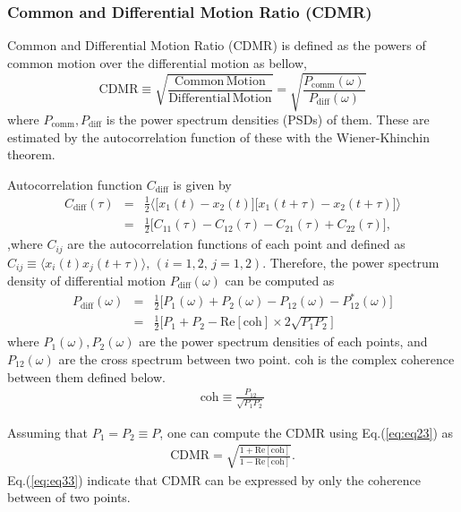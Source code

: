 \documentclass[a4paper,12pt]{book}
\begin{document}
\subsubsection{Common and Differential Motion Ratio (CDMR)}
Common and Differential Motion Ratio (CDMR) is defined as the powers of common motion over the differential motion as bellow,
\begin{equation}
  \mathrm{CDMR} \equiv \sqrt{\frac{\mathrm{Common\,Motion}}{\mathrm{Differential\,Motion}}} = \sqrt{\frac{P_{\mathrm{comm}}(\omega)}{P_{\mathrm{diff}}(\omega)}} \label{eq:eq23}
\end{equation}
where $P_{\mathrm{comm}},P_{\mathrm{diff}}$ is the power spectrum densities (PSDs) of them. These are estimated by the autocorrelation function of these with the Wiener-Khinchin theorem.

Autocorrelation function $C_{\mathrm{diff}}$ is given by
\begin{eqnarray}
  C_{\mathrm{diff}}(\tau) &=& \frac{1}{2}
  \biggl\langle
  \biggl[ x_{1}(t)-x_{2}(t) \biggr] \biggl[ x_{1}(t+\tau)-x_{2}(t+\tau) \biggr]
  \biggr\rangle \\
  &=& \frac{1}{2}\biggl[ C_{11}(\tau) - C_{12}(\tau) - C_{21}(\tau) + C_{22}(\tau) \biggr], 
\end{eqnarray}
,where $C_{ij}$ are the autocorrelation functions of each point and defined as $ C_{ij} \equiv \langle x_{i}(t)x_{j}(t+\tau)\rangle,\, (i=1,2,\,j=1,2)$. Therefore, the power spectrum density of differential motion $P_{\mathrm{diff}}(\omega)$ can be computed as
\begin{eqnarray}
  P_{\mathrm{diff}}(\omega) &=& \frac{1}{2}\biggl[ P_{1}(\omega) + P_{2}(\omega) - P_{12}(\omega) - P_{12}^*(\omega) \biggr]\\
  &=& \frac{1}{2} \biggl[ P_{1}+P_{2} - \mathrm{Re}\left[\mathrm{coh} \right]\times2\sqrt{P_{1}P_{2}} \biggr] \label{eq:eq31}
\end{eqnarray}
where $P_{1}(\omega),P_{2}(\omega)$ are the power spectrum densities of each points, and $P_{12}(\omega)$ are the cross spectrum between two point. $\mathrm{coh}$ is the complex coherence between them defined below.
\begin{eqnarray}
  \mathrm{coh} \equiv \frac{P_{12}}{\sqrt{P_{1}P_{2}}}
\end{eqnarray}

Assuming that $P_{1}=P_{2} \equiv P$, one can compute the CDMR using Eq.(\ref{eq:eq23}) as
\begin{eqnarray}
 \mathrm{CDMR} = \sqrt{\frac{1 + \mathrm{Re} \left[\mathrm{coh} \right] }{1 - \mathrm{Re} \left[\mathrm{coh} \right]}}. \label{eq:eq33}
\end{eqnarray}
Eq.(\ref{eq:eq33}) indicate that CDMR can be expressed by only the coherence between of two points.
\end{document}
